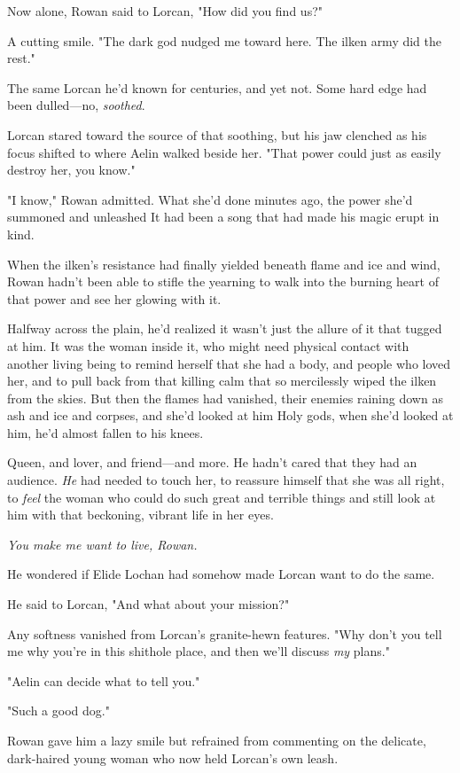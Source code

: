 Now alone, Rowan said to Lorcan, "How did you find us?"

A cutting smile. "The dark god nudged me toward here. The ilken army did the rest."

The same Lorcan he'd known for centuries, and yet  not. Some hard edge had been dulled---no, \emph{soothed}.

Lorcan stared toward the source of that soothing, but his jaw clenched as his focus shifted to where Aelin walked beside her. "That power could just as easily destroy her, you know."

"I know," Rowan admitted. What she'd done minutes ago, the power she'd summoned and unleashed  It had been a song that had made his magic erupt in kind.

When the ilken's resistance had finally yielded beneath flame and ice and wind, Rowan hadn't been able to stifle the yearning to walk into the burning heart of that power and see her glowing with it.

Halfway across the plain, he'd realized it wasn't just the allure of it that tugged at him. It was the woman inside it, who might need physical contact with another living being to remind herself that she had a body, and people who loved her, and to pull back from that killing calm that so mercilessly wiped the ilken from the skies. But then the flames had vanished, their enemies raining down as ash and ice and corpses, and she'd looked at him  Holy gods, when she'd looked at him, he'd almost fallen to his knees.

Queen, and lover, and friend---and more. He hadn't cared that they had an audience. \emph{He} had needed to touch her, to reassure himself that she was all right, to \emph{feel} the woman who could do such great and terrible things and still look at him with that beckoning, vibrant life in her eyes.

\emph{You make me want to live, Rowan.}

He wondered if Elide Lochan had somehow made Lorcan want to do the same.

He said to Lorcan, "And what about your mission?"

Any softness vanished from Lorcan's granite-hewn features. "Why don't you tell me why you're in this shithole place, and then we'll discuss
\emph{my} plans."

"Aelin can decide what to tell you."

"Such a good dog."

Rowan gave him a lazy smile but refrained from commenting on the delicate, dark-haired young woman who now held Lorcan's own leash.
